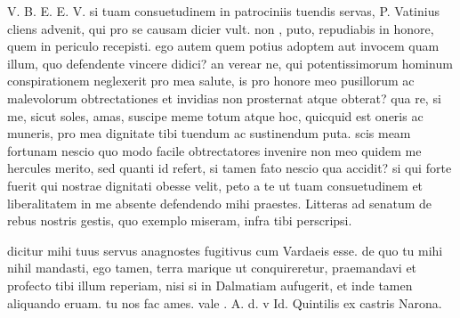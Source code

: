 


 V. B. E. E. V. si tuam consuetudinem in patrociniis tuendis servas, P. Vatinius cliens advenit, qui pro se causam dicier vult. non , puto, repudiabis in honore, quem in periculo recepisti. ego autem quem potius adoptem aut invocem quam illum, quo defendente vincere didici? an verear ne, qui potentissimorum hominum conspirationem neglexerit pro mea salute, is pro honore meo pusillorum ac malevolorum obtrectationes et invidias non prosternat atque obterat? qua re, si me, sicut soles, amas, suscipe meme totum atque hoc, quicquid est oneris ac muneris, pro mea dignitate tibi tuendum ac sustinendum puta. scis meam fortunam nescio quo modo facile obtrectatores invenire non meo quidem me hercules merito, sed quanti id refert, si tamen fato nescio qua accidit? si qui forte fuerit qui nostrae dignitati obesse velit, peto a te ut tuam consuetudinem et liberalitatem in me absente defendendo mihi praestes. Litteras ad senatum de rebus nostris gestis, quo exemplo miseram, infra tibi perscripsi.

 dicitur mihi tuus servus anagnostes fugitivus cum Vardaeis esse. de quo tu mihi nihil mandasti, ego tamen, terra marique ut conquireretur, praemandavi et profecto tibi illum reperiam, nisi si in Dalmatiam aufugerit, et inde tamen aliquando eruam. tu nos fac ames. vale . A. d. v Id. Quintilis ex castris Narona.
